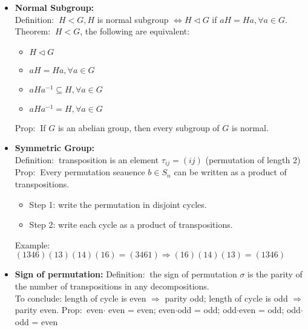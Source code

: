 \documentclass[12pt]{article}
\newcommand{\theo}{{\color{blue} Theorem: $\ $}}
\newcommand{\defi}{{\color{blue} Definition: $\ $}}
\newcommand{\exe}{{\color{green} Example: $\ $}}
\newcommand{\prop}{{\color{blue} Prop: $\ $}}
\begin{document}
\begin{itemize}
        \defi $H < G$, $[G:H]:=$ \# of left cosets of $H$ in $G$\\
        \textbf{Properties:} $|G| = [G:H] \cdot |H| \Leftrightarrow [G:H] = |G|/|H|$\\
        In general, $aH \ne Ha$, sometimes they are the same.
        \item \textbf{Normal Subgroup:}\\
        \defi $H <G, H$ is normal subgroup $\Leftrightarrow H \triangleleft G$ if $aH = Ha, \forall a \in G$.\\
        \theo $H < G$, the following are equivalent:
        \begin{itemize}
            \item $H \triangleleft G$
            \item $aH = Ha, \forall a \in G$
            \item $aHa^{-1} \subseteq H, \forall a \in G$
            \item $aHa^{-1} = H, \forall a \in G$
        \end{itemize}
        \prop If $G$ is an abelian group, then every subgroup of $G$ is normal.
    \item \textbf{Symmetric Group:}\\
        \defi transposition is an element $\tau_{ij} = (ij)$ (permutation of length 2)\\
        \prop Every permutation seauence $b \in S_n$ can be written as a product of transpositions.
        \begin{itemize}
            \item Step 1: write the permutation in disjoint cycles.
            \item Step 2: write each cycle as a product of transpositions.
        \end{itemize}
        \exe $(1346)(13)(14)(16) = (3461) \Rightarrow (16)(14)(13) = (1346)$
    \item \textbf{Sign of permutation:}
        \defi the sign of permutation $\sigma$ is the parity of the number of transpositions in any decompositions.\\
        To conclude: length of cycle is even $\Rightarrow$ parity odd; length of cycle is odd $\Rightarrow$ parity even.
        \prop even$\cdot$ even = even; even$\cdot$odd = odd; odd$\cdot$even = odd; odd$\cdot$odd = even
    \end{itemize}
\end{document}

